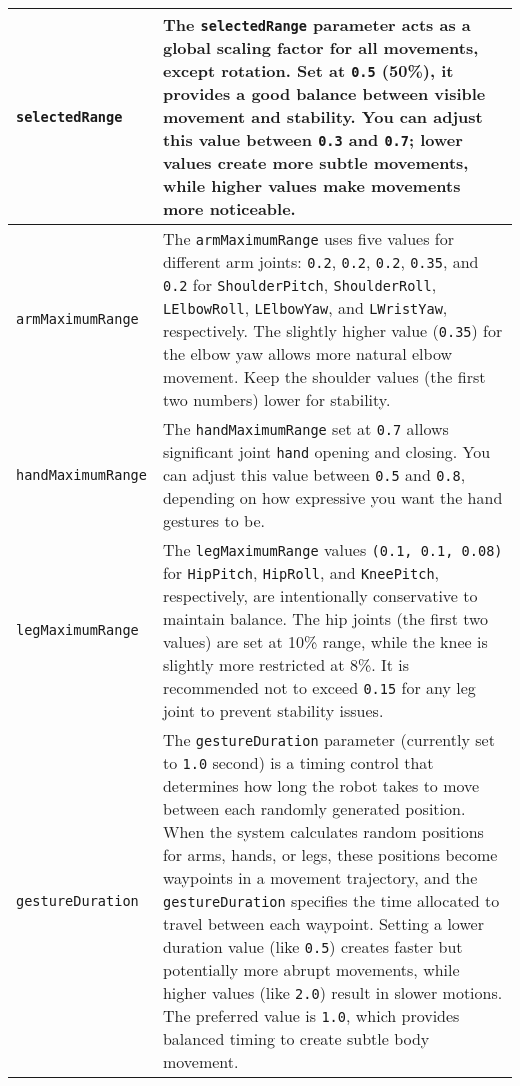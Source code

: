 \documentclass{CSSRforAfrica}
\begin{document}
\begin{longtable}{|>{\raggedright\arraybackslash}p{}|>{\raggedright\arraybackslash}p{}|}
    \texttt{selectedRange} & The \texttt{selectedRange} parameter acts as a global scaling factor for all movements, except rotation. Set at \texttt{0.5} (50\%), it provides a good balance between visible movement and stability. You can adjust this value between \texttt{0.3} and \texttt{0.7}; lower values create more subtle movements, while higher values make movements more noticeable.
    \\ \hline
    
    \texttt{armMaximumRange} & The \texttt{armMaximumRange} uses five values for different arm joints: \texttt{0.2}, \texttt{0.2}, \texttt{0.2}, \texttt{0.35}, and \texttt{0.2} for \texttt{ShoulderPitch}, \texttt{ShoulderRoll}, \texttt{LElbowRoll}, \texttt{LElbowYaw}, and \texttt{LWristYaw}, respectively. The slightly higher value (\texttt{0.35}) for the elbow yaw allows more natural elbow movement. Keep the shoulder values (the first two numbers) lower for stability.
    \\ \hline
    
    \texttt{handMaximumRange} & The \texttt{handMaximumRange} set at \texttt{0.7} allows significant joint \texttt{hand} opening and closing. You can adjust this value between \texttt{0.5} and \texttt{0.8}, depending on how expressive you want the hand gestures to be.
    \\ \hline
    
    \texttt{legMaximumRange} & The \texttt{legMaximumRange} values \texttt{(0.1, 0.1, 0.08)} for \texttt{HipPitch}, \texttt{HipRoll}, and \texttt{KneePitch}, respectively, are intentionally conservative to maintain balance. The hip joints (the first two values) are set at 10\% range, while the knee is slightly more restricted at 8\%. It is recommended not to exceed \texttt{0.15} for any leg joint to prevent stability issues.
    \\ \hline
    
    \texttt{gestureDuration} & The \texttt{gestureDuration} parameter (currently set to \texttt{1.0} second) is a timing control that determines how long the robot takes to move between each randomly generated position. When the system calculates random positions for arms, hands, or legs, these positions become waypoints in a movement trajectory, and the \texttt{gestureDuration} specifies the time allocated to travel between each waypoint. Setting a lower duration value (like \texttt{0.5}) creates faster but potentially more abrupt movements, while higher values (like \texttt{2.0}) result in slower motions. The preferred value is \texttt{1.0}, which provides balanced timing to create subtle body movement.
    \\ \hline
    

\end{longtable}
\end{document}
